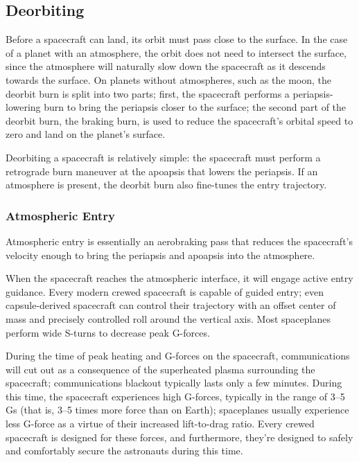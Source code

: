 \subsection{Deorbiting}
\label{subsec:deorbiting}

Before a spacecraft can land, its orbit must pass close to the
surface. In the case of a planet with an atmosphere, the orbit does
not need to intersect the surface, since the atmosphere will naturally
slow down the spacecraft as it descends towards the surface. On
planets without atmospheres, such as the moon, the deorbit burn is
split into two parts; first, the spacecraft performs a
periapsis-lowering burn to bring the periapsis closer to the surface;
the second part of the deorbit burn, the braking burn, is used to
reduce the spacecraft's orbital speed to zero and land on the planet's
surface.

Deorbiting a spacecraft is relatively simple: the spacecraft must
perform a retrograde burn maneuver at the apoapsis that lowers the
periapsis. If an atmosphere is present, the deorbit burn also
fine-tunes the entry trajectory.

\subsubsection{Atmospheric Entry}
\label{subsubsec:atmospheric-entry}

Atmospheric entry is essentially an aerobraking pass that reduces the
spacecraft's velocity enough to bring the periapsis and apoapsis into
the atmosphere.


When the spacecraft reaches the atmospheric interface, it will engage
active entry guidance. Every modern crewed spacecraft is capable of
guided entry; even capsule-derived spacecraft can control their
trajectory with an offset center of mass and precisely controlled roll
around the vertical axis. Most spaceplanes perform wide S-turns to
decrease peak G-forces.


\illustrationsoon

During the time of peak heating and G-forces on the spacecraft,
communications will cut out as a consequence of the superheated plasma
surrounding the spacecraft; communications blackout typically lasts
only a few minutes. During this time, the spacecraft experiences high
G-forces, typically in the range of 3--5 Gs (that is, 3--5 times more
force than on Earth); spaceplanes usually experience less G-force as a
virtue of their increased lift-to-drag ratio. Every crewed spacecraft
is designed for these forces, and furthermore, they're designed to
safely and comfortably secure the astronauts during this time.


